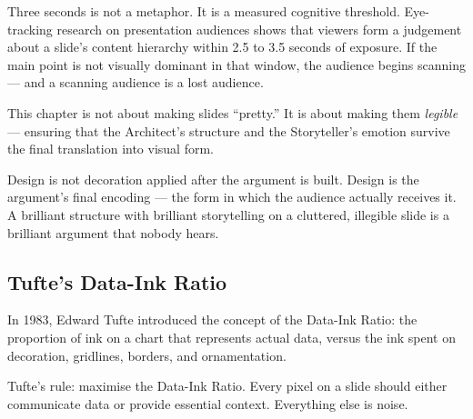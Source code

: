 Three seconds is not a metaphor. It is a measured cognitive threshold. Eye-tracking research on presentation audiences shows that viewers form a judgement about a slide's content hierarchy within 2.5 to 3.5 seconds of exposure. If the main point is not visually dominant in that window, the audience begins scanning --- and a scanning audience is a lost audience.

This chapter is not about making slides ``pretty.'' It is about making them \emph{legible} --- ensuring that the Architect's structure and the Storyteller's emotion survive the final translation into visual form.

\begin{thesisbox}
Design is not decoration applied after the argument is built. Design is the argument's final encoding --- the form in which the audience actually receives it. A brilliant structure with brilliant storytelling on a cluttered, illegible slide is a brilliant argument that nobody hears.
\end{thesisbox}



\subsection{Tufte's Data-Ink Ratio}

In 1983, Edward Tufte introduced the concept of the Data-Ink Ratio: the proportion of ink on a chart that represents actual data, versus the ink spent on decoration, gridlines, borders, and ornamentation.

Tufte's rule: maximise the Data-Ink Ratio. Every pixel on a slide should either communicate data or provide essential context. Everything else is noise.

